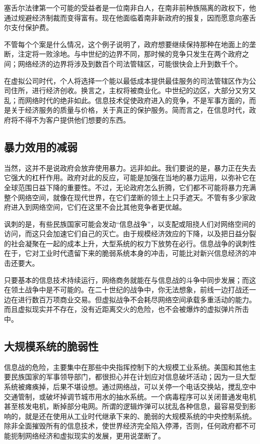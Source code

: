 塞舌尔法律第一个可能的受益者是一位南非白人，在南非前种族隔离的政权下，他通过规避经济制裁而变得富有。现在他面临着南非新政府的报复，因而愿意向塞舌尔支付保护费。

不管每个个案是什么情况，这个例子说明了，政府想要继续保持那种在地面上的垄断，注定将一败涂地。与中世纪的边界不同，那时候的竞争只发生在两个政府之间；网络经济的边界将涉及到数百个司法管辖区，可能很快会上升到数千个。

在虚拟公司时代，个人将选择一个能以最低成本提供最佳服务的司法管辖区作为公司住所，进行经济创收。换言之，主权将被商业化。中世纪的边区，大部分又穷又乱；而网络时代的绝非如此。信息技术促使政府进入的竞争，不是军事方面的，而是关于经济服务的质量与价格，关于真正的保护服务。简而言之，在信息时代，政府将不得不为客户提供他们想要的东西。

\subsection{暴力效用的减弱}
当然，这并不是说政府会放弃使用暴力。远非如此。我们要说的是，暴力正在失去它强大的杠杆作用。政府对此的反应，可能是加强在当地的暴力运用，以弥补它在全球范围日益下降的重要性。不过，无论政府怎么折腾，它们都不可能将暴力充满整个网络空间，就像在现代世界，在它们垄断的领土上只手遮天。不管有多少家政府进入到网络空间，它们在这里不会比其他竞争者更优越。

讽刺的是，有些民族国家可能会发动“信息战争”，以支配或阻挠人们对网络空间的访问，而这只会加速它们自己的灭亡。由于规模经济效应的下降，以及把日益分裂的社会凝聚在一起的成本上升，大型系统的权力下放势在必行。信息战争的讽刺性在于，它对工业时代遗留下来的脆弱系统本身的冲击，可能比对新兴信息经济的冲击还要大。

只要基本的信息技术持续运行，网络商务就能在与信息战的斗争中同步发展；而这在领土战争中是不可能的。在二十世纪的战争中，你无法想象，前线一边打战还一边在进行数百万项商业交易。但虚拟战争不会耗尽网络空间承载多重活动的能力。而且虚拟现实并不存在，没有近距离交火的危险，也不会被爆炸的虚拟弹片所击中。

\subsection{大规模系统的脆弱性}
信息战的危险，主要集中在那些中央指挥控制下的大规模工业系统。美国和其他主要民族国家的军事领导部门，都很担心并在计划应对信息破坏活动；因为一旦大型系统被瘫痪掉，后果不堪设想。通过网络战，可以关停一个电话交换站，搅乱空中交通管制，或破坏掉调节城市用水的抽水系统。一个病毒程序可以关闭普通发电机甚至核发电机，断掉部分电网。所谓的逻辑炸弹可以扰乱各种信息，最容易受到影响的，就是还在使用从工业时代继承下来的、脆弱的大规模系统的中央控制系统。除非全面摧毁所有的信息技术，使世界经济完全陷入停滞，否则，任何政府都不可能扼制网络经济和虚拟现实的发展，更用说垄断了。

